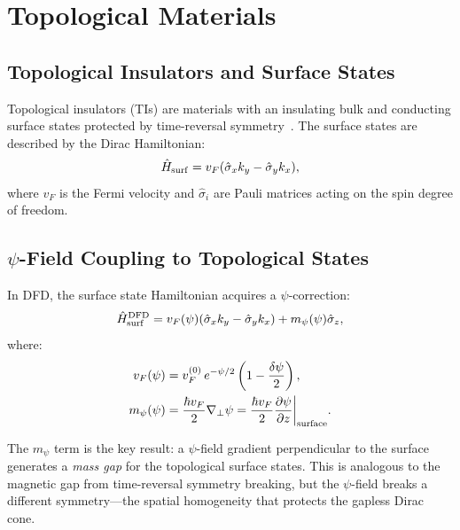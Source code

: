 \documentclass[aps,prb,twocolumn,superscriptaddress,floatfix,nofootinbib,longbibliography]{revtex4-2}
\begin{document}
\section{Topological Materials}\label{sec:topological}

\subsection{Topological Insulators and Surface States}

Topological insulators (TIs) are materials with an insulating bulk and
conducting surface states protected by time-reversal
symmetry~\cite{Hasan2010,Qi2011}.  The surface states are described
by the Dirac Hamiltonian:
\begin{equation}
\hat{H}_{\rm surf} = v_F(\hat{\sigma}_x k_y - \hat{\sigma}_y k_x),
\label{eq:TI-surface}
\end{equation}
where $v_F$ is the Fermi velocity and $\hat{\sigma}_i$ are Pauli
matrices acting on the spin degree of freedom.

\subsection{$\psi$-Field Coupling to Topological States}

In DFD, the surface state Hamiltonian acquires a $\psi$-correction:
\begin{equation}
\hat{H}_{\rm surf}^{\rm DFD} = v_F(\psi)(\hat{\sigma}_x k_y
- \hat{\sigma}_y k_x) + m_\psi(\psi)\hat{\sigma}_z,
\label{eq:TI-psi}
\end{equation}
where:
\begin{align}
v_F(\psi) &= v_F^{(0)}\,e^{-\psi/2}\left(1 - \frac{\delta\psi}{2}\right),
\label{eq:vF-psi}\\
m_\psi(\psi) &= \frac{\hbar v_F}{2}\nabla_\perp\psi
= \frac{\hbar v_F}{2}\frac{\partial\psi}{\partial z}\bigg|_{\rm surface}.
\label{eq:mass-psi}
\end{align}

The $m_\psi$ term is the key result: a $\psi$-field gradient
perpendicular to the surface generates a \emph{mass gap} for the
topological surface states.  This is analogous to the magnetic gap
from time-reversal symmetry breaking, but the $\psi$-field breaks a
different symmetry---the spatial homogeneity that protects the
gapless Dirac cone.
\end{document}
